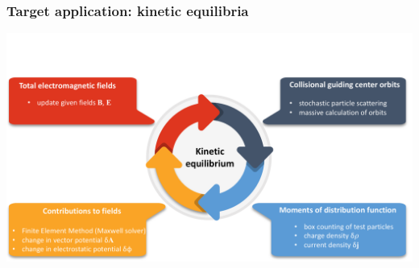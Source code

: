 \documentclass{beamer}
\begin{document}
\begin{frame}
\frametitle{Target application: kinetic equilibria}
	\centering \includegraphics[trim={0 0 0 3cm},clip,width=\textwidth]{FIGURES/cycle01.pdf}
\end{frame}




\end{document}
